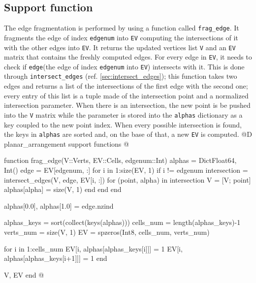 \subsection{Support function}
\label{sec:frag_edge}
The edge fragmentation is performed by using a function called \texttt{frag\_edge}.
It fragments the edge of index \texttt{edgenum} into \texttt{EV} computing the intersections of
it with the other edges into \texttt{EV}. It returns the updated vertices list \texttt{V} and an 
\texttt{EV} matrix that contains the freshly computed edges.
For every edge in \texttt{EV}, it needs to check if \texttt{edge}(the edge of index \texttt{edgenum} into 
\texttt{EV}) intersects with it. This is done through \texttt{intersect\_edges} (ref. \ref{sec:intersect_edges}); 
this function takes two edges and returns a list of the intersections of the first edge with the second one; 
every entry of this list is a tuple made of the intersection point and a normalized intersection parameter. 
When there is an intersection, the new point is be pushed into the \texttt{V} matrix while the parameter 
is stored into the \texttt{alphas} dictionary as a key coupled to the new point index.
When every possible intersection is found, the keys in \texttt{alphas} are sorted and, on the base of that,
a new \texttt{EV} is computed.
@D planar\_arrangement support functions
@{function frag_edge(V::Verts, EV::Cells, edgenum::Int)
    alphas = Dict{Float64, Int}()
    edge = EV[edgenum, :]
    for i in 1:size(EV, 1)
        if i != edgenum
            intersection = intersect_edges(V, edge, EV[i, :])
            for (point, alpha) in intersection
                V = [V; point]
                alphas[alpha] = size(V, 1)
            end
        end
    end

    alphas[0.0], alphas[1.0] = edge.nzind

    alphas_keys = sort(collect(keys(alphas)))
    cells_num = length(alphas_keys)-1
    verts_num = size(V, 1)
    EV = spzeros(Int8, cells_num, verts_num)

    for i in 1:cells_num
        EV[i, alphas[alphas_keys[i]]] = 1
        EV[i, alphas[alphas_keys[i+1]]] = 1
    end

    V, EV
end
@}

